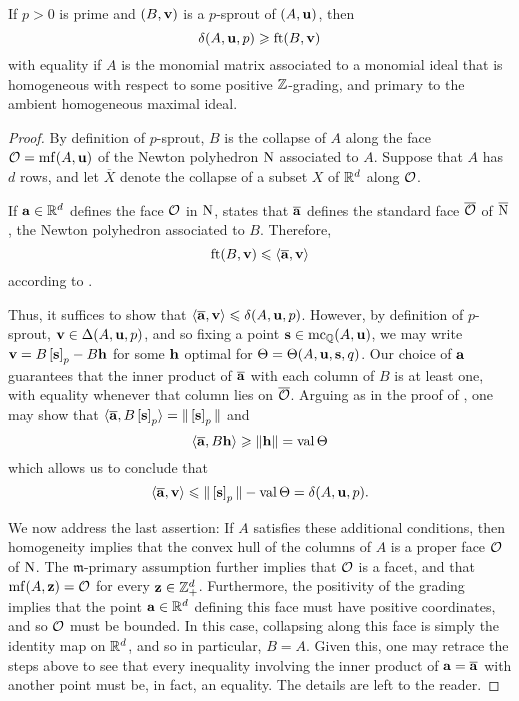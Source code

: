 \documentclass[11pt]{amsart}
\renewcommand{\!}[1]{{\color{red}\text{$\star$\,}#1\,$\star$}}
\newcommand{\ol}[1]{\overline{#1}}
\begin{document}
\begin{lemma}  If  $p>0$ is prime and $(B, \mathbf{v})$ is a $p$-sprout of  $(A, \mathbf{u})$, then \[ \delta(A, \mathbf{u}, p) \geqslant \operatorname{ft}(B, \mathbf{v})\]
with equality if $A$ is the monomial matrix associated to a monomial ideal that is homogeneous with respect to some positive $\mathbb{Z}$-grading, and primary to the ambient homogeneous maximal ideal.
\end{lemma}

\begin{proof}
By definition of $p$-sprout,  $B$ is the collapse of $A$ along the face $\mathcal{O} = \operatorname{mf}(A, \mathbf{u})$ of the Newton polyhedron $\mathrm{N}$ associated to $A$.  Suppose that $A$ has $d$ rows, and let $\ol{X}$ denote the collapse of a subset $X$ of $\mathbb{R}^d$ along $\mathcal{O}$.  

If $\mathbf{a} \in \mathbb{R}^d$ defines the face $\mathcal{O}$ in $\mathrm{N}$,   states that $\ol{\vv{a}}$ defines the standard face $\ol{\O}$ of $\ol{\N}$, the Newton polyhedron associated to $B$.  Therefore,
\[ \ft{B}{\vv{v}} \leq \iprod{\ol{\vv{a}}}{\vv{v}} \] according to .

Thus, it suffices to show that $\iprod{\ol{\vv{a}}}{\vv{v}} \leq \delta(A, \vv{u}, p)$.  However, by definition of $p$-sprout, $\mathbf{v} \in \Delta(A, \mathbf{u}, p)$, and so fixing a point $\mathbf{s} \in \operatorname{mc}_{\mathbb{Q}}(A, \mathbf{u})$, we may write $ \mathbf{v} = B \left[ \mathbf{s} \right]_p - B \mathbf{h}$ for some $\mathbf{h}$  optimal for $\Theta = \Theta(A, \mathbf{u}, \mathbf{s}, q)$.  Our choice of $\mathbf{a}$ guarantees that the inner product of $\ol{\vv{a}}$ with each column of $B$ is at least one, with equality whenever that column lies on $\ol{\O}$.  Arguing as in the proof of , one may show that $\iprod{\ol{\vv{a}}}{B \tail{\vv{s}}_p} = \norm{\tail{\vv{s}}_p}$ and \[ \iprod{\ol{\vv{a}}}{ B \vv{h}} \geq \norm{\vv{h}} = \val \ip \] 
which allows us to conclude that \[ \iprod{\ol{\vv{a}}}{\vv{v}} \leq \norm{\tail{\vv{s}}_p} - \val \ip= \delta(A, \vv{u}, p).\]

We now address the last assertion:  If $A$ satisfies these additional conditions, then homogeneity implies that the convex hull of the columns of $A$ is a proper face $\mathcal{O}$ of $\mathrm{N}$.  The $\mathfrak{m}$-primary assumption further implies that $\mathcal{O}$ is a facet, and that $\operatorname{mf}(A, \mathbf{z}) = \mathcal{O}$ for every $\mathbf{z} \in \mathbb{Z}_+^d$.  Furthermore, the positivity of the grading implies that the point $\mathbf{a} \in \mathbb{R}^d$ defining this face must have positive coordinates, and so $\mathcal{O}$ must be bounded.  In this case, collapsing along this face is simply the identity map on $\mathbb{R}^d$, and so in particular, $B=A$.  Given this, one may retrace the steps above to see that every inequality involving the inner product of $\vv{a} = \ol{\vv{a}}$ with another point must be, in fact, an equality.  The details are left to the reader.
\end{proof}
\end{document}
